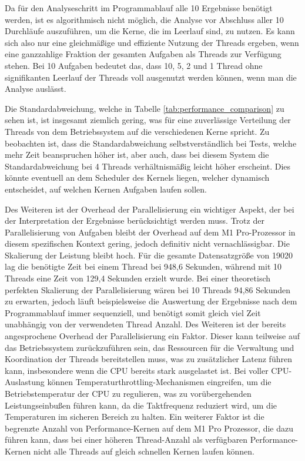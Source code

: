 Da für den Analyseschritt im Programmablauf alle 10 Ergebnisse benötigt werden, ist es algorithmisch nicht möglich, die Analyse vor Abschluss aller 10 Durchläufe auszuführen, um die Kerne, die im Leerlauf sind, zu nutzen. Es kann sich also nur eine gleichmäßige und effiziente Nutzung der Threads ergeben, wenn eine ganzzahlige Fraktion der gesamten Aufgaben als Threads zur Verfügung stehen. Bei 10 Aufgaben bedeutet das, dass 10, 5, 2 und 1 Thread ohne signifikanten Leerlauf der Threads voll ausgenutzt werden können, wenn man die Analyse auslässt.

Die Standardabweichung, welche in Tabelle \ref{tab:performance_comparison} zu sehen ist, ist insgesamt ziemlich gering, was für eine zuverlässige Verteilung der Threads von dem Betriebssystem  auf die verschiedenen Kerne spricht. Zu beobachten ist, dass die Standardabweichung selbstverständlich bei Tests, welche mehr Zeit beanspruchen höher ist, aber auch, dass bei diesem System die Standardabweichung bei 4 Threads verhältnismäßig leicht höher erscheint. Dies könnte eventuell an dem Scheduler des Kernels liegen, welcher dynamisch entscheidet, auf welchen Kernen Aufgaben laufen sollen.

Des Weiteren ist der Overhead der Parallelisierung ein wichtiger Aspekt, der bei der Interpretation der Ergebnisse berücksichtigt werden muss. Trotz der Parallelisierung von Aufgaben bleibt der Overhead auf dem M1 Pro-Prozessor in diesem spezifischen Kontext gering, jedoch definitiv nicht vernachlässigbar. Die Skalierung der Leistung bleibt hoch. Für die gesamte Datensatzgröße von 19020 lag die benötigte Zeit bei einem Thread bei 948,6 Sekunden, während mit 10 Threads eine Zeit von 129,4 Sekunden erzielt wurde. Bei einer theoretisch perfekten Skalierung der Parallelisierung wären bei 10 Threads 94,86 Sekunden zu erwarten, jedoch läuft beispielsweise die Auswertung der Ergebnisse nach dem Programmablauf immer sequenziell, und benötigt somit gleich viel Zeit unabhängig von der verwendeten Thread Anzahl. Des Weiteren ist der bereits angesprochene Overhead der Parallelisierung ein Faktor. Dieser kann teilweise auf das Betriebssystem zurückzuführen sein, das Ressourcen für die Verwaltung und Koordination der Threads bereitstellen muss, was zu zusätzlicher Latenz führen kann, insbesondere wenn die CPU bereits stark ausgelastet ist. Bei voller CPU-Auslastung können Temperaturthrottling-Mechanismen eingreifen, um die Betriebstemperatur der CPU zu regulieren, was zu vorübergehenden Leistungseinbußen führen kann, da die Taktfrequenz reduziert wird, um die Temperaturen im sicheren Bereich zu halten. Ein weiterer Faktor ist die begrenzte Anzahl von Performance-Kernen auf dem M1 Pro Prozessor, die dazu führen kann, dass bei einer höheren Thread-Anzahl als verfügbaren Performance-Kernen nicht alle Threads auf gleich schnellen Kernen laufen können.

